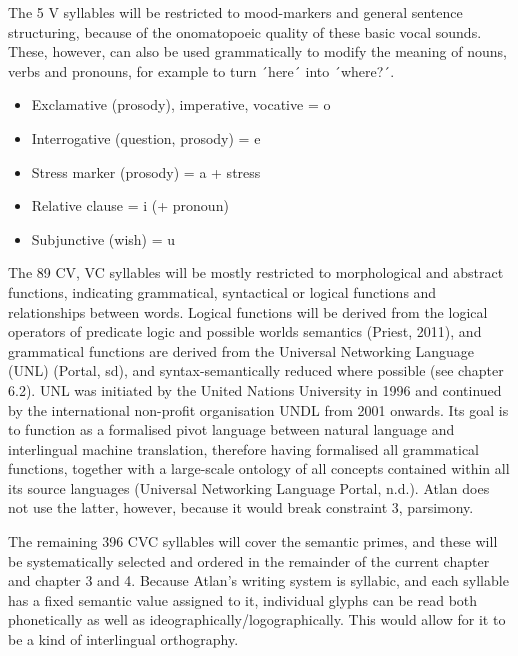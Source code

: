 The 5 V syllables will be restricted to mood-markers and general sentence structuring, because of the onomatopoeic quality of these basic vocal sounds. These, however, can also be used grammatically to modify the meaning of nouns, verbs and pronouns, for example to turn ´here´ into ´where?´.  
\begin{itemize}
\item    Exclamative (prosody), imperative, vocative = o  

\item    Interrogative (question, prosody) = e  

\item    Stress marker (prosody) = a + stress 

\item    Relative clause = i (+ pronoun) 

\item    Subjunctive (wish) = u 
\end{itemize}

 

The 89 CV, VC syllables will be mostly restricted to morphological and abstract functions, indicating grammatical, syntactical or logical functions and relationships between words. Logical functions will be derived from the logical operators of predicate logic and possible worlds semantics (Priest, 2011), and grammatical functions are derived from the Universal Networking Language (UNL) (Portal, sd), and syntax-semantically reduced where possible (see chapter 6.2). UNL was initiated by the United Nations University in 1996 and continued by the international non-profit organisation UNDL from 2001 onwards. Its goal is to function as a formalised pivot language between natural language and interlingual machine translation, therefore having formalised all grammatical functions, together with a large-scale ontology of all concepts contained within all its source languages (Universal Networking Language Portal, n.d.). Atlan does not use the latter, however, because it would break constraint 3, parsimony. 	

The remaining 396 CVC syllables will cover the semantic primes, and these will be systematically selected and ordered in the remainder of the current chapter and chapter 3 and 4. Because Atlan’s writing system is syllabic, and each syllable has a fixed semantic value assigned to it, individual glyphs can be read both phonetically as well as ideographically/logographically. This would allow for it to be a kind of interlingual orthography. 

